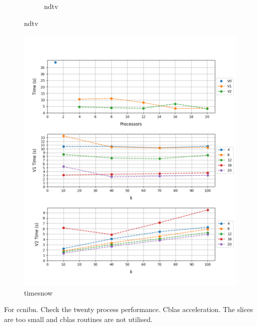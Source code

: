 \documentclass[12pt, a4paper]{article}
\begin{document}
\begin{figure}[h!]
\begin{subfigure}[b]{0.33\textwidth}
         \caption{ndtv} 
     \end{subfigure}
\end{figure}

\begin{figure}[h!]
    \centering
    \includegraphics[height=.4\textheight, width=\textwidth, keepaspectratio]{assets/tv/timesnow.png}
    \caption{timesnow}
\end{figure}

For ccnibn. Check the twenty process performance. Cblas acceleration. The slices are too small and cblas routines are not utilised.
\end{document}
